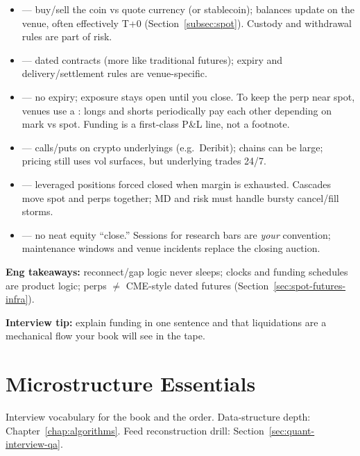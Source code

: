 \begin{itemize}
    \item {} --- buy/sell the coin vs quote currency (or stablecoin); 
          balances update on the venue, often effectively T+0 
          (Section~\ref{subsec:spot}). Custody and withdrawal rules are part of risk.
    \item {} --- dated contracts (more like traditional futures); 
          expiry and delivery/settlement rules are venue-specific.
    \item {} --- no expiry; exposure stays 
          open until you close. To keep the perp near spot, venues use a 
          : longs and shorts periodically pay each other 
          depending on mark vs spot. Funding is a first-class P\&L line, not a 
          footnote.
    \item {} --- calls/puts on crypto underlyings (e.g.\ Deribit); 
          chains can be large; pricing still uses vol surfaces, but underlying 
          trades 24/7.
    \item {} --- leveraged positions forced closed when 
          margin is exhausted. Cascades move spot and perps together; MD and risk 
          must handle bursty cancel/fill storms.
    \item {} --- no neat equity ``close.'' Sessions for 
          research bars are \emph{your} convention; maintenance windows and venue 
          incidents replace the closing auction.
\end{itemize}
\par\noindent\textbf{Eng takeaways:} reconnect/gap logic never sleeps; clocks and 
funding schedules are product logic; perps $\neq$ CME-style dated futures 
(Section~\ref{sec:spot-futures-infra}).
\par\noindent\textbf{Interview tip:} explain funding in one sentence and that 
liquidations are a mechanical flow your book will see in the tape.

\section{Microstructure Essentials}
\label{sec:microstructure}
Interview vocabulary for the book and the order. Data-structure depth: 
Chapter~\ref{chap:algorithms}. Feed reconstruction drill: 
Section~\ref{sec:quant-interview-qa}.

